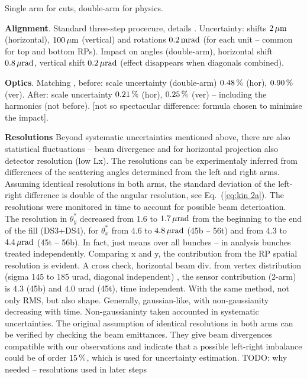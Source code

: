 \documentclass[TOTEM]{cern/cernphprep}
\def\un#1{\,{\rm #1}}
\begin{document}
Single arm for cuts, double-arm for physics.

{\bf Alignment}. Standard three-step procecure, details \cite{totem-ijmp}. Uncertainty: shifts $2\un{\mu m}$ (horizontal), $100\un{\mu m}$ (vertical) and rotations $0.2\un{mrad}$ (for each unit -- common for top and bottom RPs). Impact on angles (double-arm), horizontal shift $0.8\un{\mu rad}$, vertical shift $0.2\un{\mu rad}$ (effect disappears when diagonals combined). %

{\bf Optics}. Matching \cite{totem-optics}, before: scale uncertainty (double-arm) $0.48\un{\%}$ (hor), $0.90\un{\%}$ (ver). After: scale uncertainty $0.21\un{\%}$ (hor), $0.25\un{\%}$ (ver) -- including the harmonics (not before). [not so spectacular difference: formula chosen to minimise the impact].

{\bf Resolutions} Beyond systematic uncertainties mentioned above, there are also statistical fluctuations -- beam divergence and for horizontal projection also detector resolution (low Lx). The resolutions can be experimentaly inferred from differences of the scattering angles determined from the left and right arms. Assuming identical resolutions in both arms, the standard deviation of the left-right difference is double of the angular resolution, see Eq.~(\ref{eq:kin 2a}). The resolutions were monitored in time to account for possible beam deterioation. The resolution in $\theta_y^*$ decreased from $1.6$ to $1.7\un{\mu rad}$ from the beginning to the end of the fill (DS3+DS4), for $\theta_x^*$ from $4.6$ to $4.8\un{\mu rad}$ (45b -- 56t) and from $4.3$ to $4.4\un{\mu rad}$ (45t -- 56b). In fact, just means over all bunches -- in analysis bunches treated independently. Comparing x and y, the contribution from the RP spatial resolution is evident. A cross check, horizontal beam div. from vertex distribution (sigma 145 to 185 urad, diagonal independent) %
, the sensor contribution (2-arm) is $4.3$ (45b) and $4.0$ urad (45t), time independent. With the same method, not only RMS, but also shape. Generally, gaussian-like, with non-gaussianity decreasing with time. Non-gaussianinty taken accounted in systematic uncertainties. The original assumption of identical resolutions in both arms can be verified by checking the beam emittances. They give beam divergences compatible with our observations and indicate that a possible left-right imbalance could be of order $15\un{\%}$, which is used for uncertainty estimation.
TODO: why needed -- resolutions used in later steps
\end{document}
